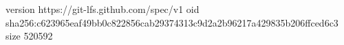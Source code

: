 version https://git-lfs.github.com/spec/v1
oid sha256:c623965eaf49bb0c822856cab29374313c9d2a2b96217a429835b206ffced6c3
size 520592
